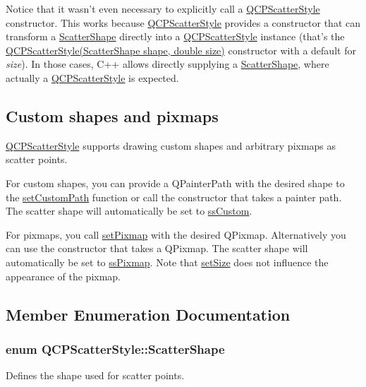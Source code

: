 \begin{DoxyCodeInclude}
\end{DoxyCodeInclude}
 \-Notice that it wasn't even necessary to explicitly call a \hyperlink{classQCPScatterStyle}{\-Q\-C\-P\-Scatter\-Style} constructor. \-This works because \hyperlink{classQCPScatterStyle}{\-Q\-C\-P\-Scatter\-Style} provides a constructor that can transform a \hyperlink{classQCPScatterStyle_adb31525af6b680e6f1b7472e43859349}{\-Scatter\-Shape} directly into a \hyperlink{classQCPScatterStyle}{\-Q\-C\-P\-Scatter\-Style} instance (that's the \hyperlink{classQCPScatterStyle_a003d92f74f4561eda111862eadd62f28}{\-Q\-C\-P\-Scatter\-Style(\-Scatter\-Shape shape, double size)} constructor with a default for {\itshape size\/}). \-In those cases, \-C++ allows directly supplying a \hyperlink{classQCPScatterStyle_adb31525af6b680e6f1b7472e43859349}{\-Scatter\-Shape}, where actually a \hyperlink{classQCPScatterStyle}{\-Q\-C\-P\-Scatter\-Style} is expected.\hypertarget{classQCPScatterStyle_QCPScatterStyle-custompath-and-pixmap}{}\subsection{\-Custom shapes and pixmaps}\label{classQCPScatterStyle_QCPScatterStyle-custompath-and-pixmap}
\hyperlink{classQCPScatterStyle}{\-Q\-C\-P\-Scatter\-Style} supports drawing custom shapes and arbitrary pixmaps as scatter points.

\-For custom shapes, you can provide a \-Q\-Painter\-Path with the desired shape to the \hyperlink{classQCPScatterStyle_a96a3e949f90b2afe5677ca9412a12a1e}{set\-Custom\-Path} function or call the constructor that takes a painter path. \-The scatter shape will automatically be set to \hyperlink{classQCPScatterStyle_adb31525af6b680e6f1b7472e43859349a15d9bcfd9de94edda949006529f9219d}{ss\-Custom}.

\-For pixmaps, you call \hyperlink{classQCPScatterStyle_a5fb611d46acfac520d7b89a1c71d9246}{set\-Pixmap} with the desired \-Q\-Pixmap. \-Alternatively you can use the constructor that takes a \-Q\-Pixmap. \-The scatter shape will automatically be set to \hyperlink{classQCPScatterStyle_adb31525af6b680e6f1b7472e43859349a8718b849ca7c307b07b8e091efb0c31e}{ss\-Pixmap}. \-Note that \hyperlink{classQCPScatterStyle_aaefdd031052892c4136129db68596e0f}{set\-Size} does not influence the appearance of the pixmap. 

\subsection{\-Member \-Enumeration \-Documentation}
\hypertarget{classQCPScatterStyle_adb31525af6b680e6f1b7472e43859349}{
\subsubsection[{\-Scatter\-Shape}]{\setlength{\rightskip}{0pt plus 5cm}enum {\bf \-Q\-C\-P\-Scatter\-Style\-::\-Scatter\-Shape}}}\label{classQCPScatterStyle_adb31525af6b680e6f1b7472e43859349}
\-Defines the shape used for scatter points.


